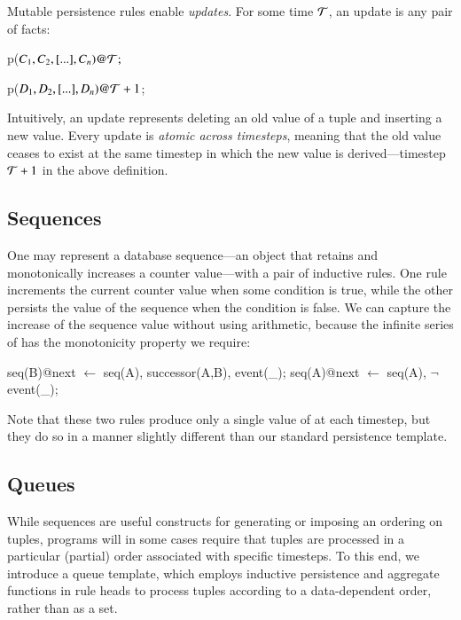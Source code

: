 Mutable persistence rules enable {\em updates}.  For some time $\Tau$, an
update is any pair of facts:

\begin{dedalus}
p\nega($C_1,C_2,[...],C_n)@\Tau;$
\end{dedalus}

\begin{dedalus}
p\pos($D_1,D_2,[...],D_n)@\Tau+1$;
\end{dedalus}


\noindent
Intuitively, an update represents deleting an old value of a tuple and
inserting a new value.  Every update is {\em atomic across timesteps}, meaning
that the old value ceases to exist at the same timestep in which the new value
is derived---timestep $\Tau+1$ in the above definition.


\subsection{Sequences}
One may represent a database sequence---an object that retains and monotonically increases a counter value---with a pair of inductive rules.  One rule increments the current counter value when some condition is 
true, while the other persists the value of the sequence when the condition is false.  We can capture the increase
of the sequence value without using arithmetic, because the infinite series of  has the monotonicity
property we require:

\begin{Dedalus}
seq(B)@next \(\leftarrow\) seq(A), successor(A,B), event(_);  
seq(A)@next \(\leftarrow\) seq(A), \(\lnot\)event(_);
\end{Dedalus}

\noindent
Note that these two rules produce only a single value of  at each timestep, but they do so in a manner slightly different than our standard persistence template.

\subsection{Queues}

While sequences are useful constructs for generating or imposing an ordering on tuples, programs will in some cases require that tuples
are processed in a particular (partial) order associated with specific timesteps.   To this end, we introduce a queue template, which employs 
inductive persistence and aggregate functions in rule heads to process tuples according to a data-dependent order, rather than as a set.

